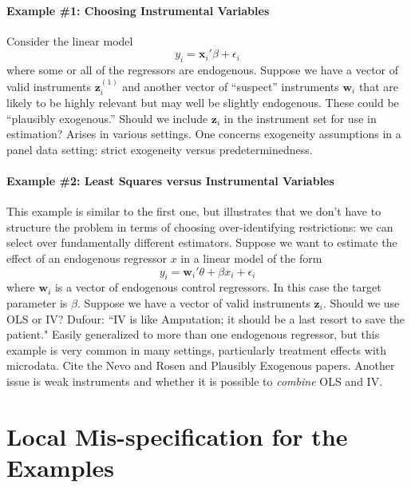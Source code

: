 \documentclass[12pt]{article}
\theoremstyle{definition}
\begin{document}
\paragraph{Example \#1: Choosing Instrumental Variables}
Consider the linear model
  \begin{equation}
  y_i = \mathbf{x}_i'\beta + \epsilon_i
  \end{equation}
where some or all of the regressors are endogenous. Suppose we have a vector of valid instruments $\mathbf{z}^{(1)}_i$ and another vector of ``suspect'' instruments $\mathbf{w}_i$ that are likely to be highly relevant but may well be slightly endogenous. These could be ``plausibly exogenous.'' Should we include $\mathbf{z}_i$ in the instrument set for use in estimation?  Arises in various settings. One concerns exogeneity assumptions in a panel data setting: strict exogeneity versus predeterminedness. 

\paragraph{Example \#2: Least Squares versus Instrumental Variables}
This example is similar to the first one, but illustrates that we don't have to structure the problem in terms of choosing over-identifying restrictions: we can select over fundamentally different estimators. Suppose we want to estimate the effect of an endogenous regressor $x$ in a linear model of the form
  \begin{equation}
    y_i = \mathbf{w}_i' \theta + \beta x_i + \epsilon_i
  \end{equation}
where $\mathbf{w}_i$ is a vector of endogenous control regressors. In this case the target parameter is $\beta$. Suppose we have a vector of valid instruments $\mathbf{z}_i$. Should we use OLS or IV? Dufour: ``IV is like Amputation; it should be a last resort to save the patient." Easily generalized to more than one endogenous regressor, but this example is very common in many settings, particularly treatment effects with microdata. Cite the Nevo and Rosen and Plausibly Exogenous papers. Another issue is weak instruments and whether it is possible to \emph{combine} OLS and IV.



\section{Local Mis-specification for the Examples}
\end{document}
